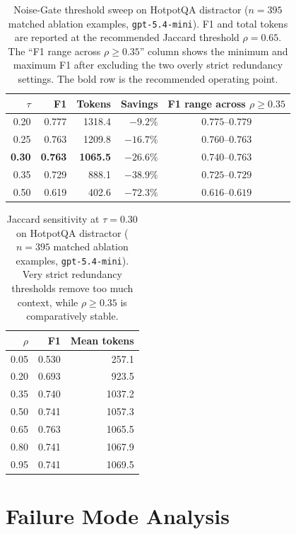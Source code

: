 \documentclass[runningheads]{llncs}
\begin{document}
\begin{table}[t]
\centering
\small
\caption{Noise-Gate threshold sweep on HotpotQA distractor ($n{=}395$ matched ablation examples, \texttt{gpt-5.4-mini}). F1 and total tokens are reported at the recommended Jaccard threshold $\rho{=}0.65$. The ``F1 range across $\rho\ge 0.35$'' column shows the minimum and maximum F1 after excluding the two overly strict redundancy settings. The bold row is the recommended operating point.}
\label{tab:noise_gate_thresholds}
\begin{tabular}{rrrrc}
\toprule
$\tau$ & F1 & Tokens & Savings & F1 range across $\rho\ge 0.35$ \\
\midrule
0.20 & 0.777 & 1318.4 & $-9.2\%$ & $0.775$--$0.779$ \\
0.25 & 0.763 & 1209.8 & $-16.7\%$ & $0.760$--$0.763$ \\
\textbf{0.30} & \textbf{0.763} & \textbf{1065.5} & $\mathbf{-26.6\%}$ & $0.740$--$0.763$ \\
0.35 & 0.729 & 888.1 & $-38.9\%$ & $0.725$--$0.729$ \\
0.50 & 0.619 & 402.6 & $-72.3\%$ & $0.616$--$0.619$ \\
\bottomrule
\end{tabular}
\end{table}

\begin{table}[t]
\centering
\small
\caption{Jaccard sensitivity at $\tau{=}0.30$ on HotpotQA distractor ($n{=}395$ matched ablation examples, \texttt{gpt-5.4-mini}). Very strict redundancy thresholds remove too much context, while $\rho \ge 0.35$ is comparatively stable.}
\label{tab:jaccard_sensitivity_pilot}
\begin{tabular}{rrr}
\toprule
$\rho$ & F1 & Mean tokens \\
\midrule
0.05 & 0.530 & 257.1 \\
0.20 & 0.693 & 923.5 \\
0.35 & 0.740 & 1037.2 \\
0.50 & 0.741 & 1057.3 \\
0.65 & 0.763 & 1065.5 \\
0.80 & 0.741 & 1067.9 \\
0.95 & 0.741 & 1069.5 \\
\bottomrule
\end{tabular}
\end{table}

\section{Failure Mode Analysis}
\label{sec:analysis}
\end{document}
